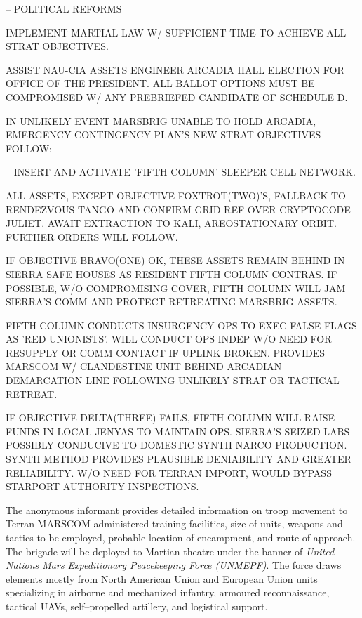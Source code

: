 \item {} -- POLITICAL REFORMS
    \startitemize[n]
    \item IMPLEMENT MARTIAL LAW W/ SUFFICIENT TIME TO ACHIEVE ALL STRAT OBJECTIVES.
    \item ASSIST NAU-CIA ASSETS ENGINEER ARCADIA HALL ELECTION FOR OFFICE OF THE PRESIDENT. ALL BALLOT OPTIONS MUST BE COMPROMISED W/ ANY PREBRIEFED CANDIDATE OF SCHEDULE D.
    \stopitemize
\stopitemize

IN UNLIKELY EVENT MARSBRIG UNABLE TO HOLD ARCADIA, EMERGENCY CONTINGENCY PLAN'S NEW STRAT OBJECTIVES FOLLOW:
\startitemize[4]
\item {} -- INSERT AND ACTIVATE 'FIFTH COLUMN' SLEEPER CELL NETWORK.

    \startitemize[n]
    \item ALL ASSETS, EXCEPT OBJECTIVE FOXTROT(TWO)'S, FALLBACK TO RENDEZVOUS TANGO AND CONFIRM GRID REF OVER CRYPTOCODE JULIET. AWAIT EXTRACTION TO KALI, AREOSTATIONARY ORBIT. FURTHER ORDERS WILL FOLLOW.

    \item IF OBJECTIVE BRAVO(ONE) OK, THESE ASSETS REMAIN BEHIND IN SIERRA SAFE HOUSES AS RESIDENT FIFTH COLUMN CONTRAS. IF POSSIBLE, W/O COMPROMISING COVER, FIFTH COLUMN WILL JAM SIERRA'S COMM AND PROTECT RETREATING MARSBRIG ASSETS.

    \item FIFTH COLUMN CONDUCTS INSURGENCY OPS TO EXEC FALSE FLAGS AS 'RED UNIONISTS'. WILL CONDUCT OPS INDEP W/O NEED FOR RESUPPLY OR COMM CONTACT IF UPLINK BROKEN. PROVIDES MARSCOM W/ CLANDESTINE UNIT BEHIND ARCADIAN DEMARCATION LINE FOLLOWING UNLIKELY STRAT OR TACTICAL RETREAT.

    \item IF OBJECTIVE DELTA(THREE) FAILS, FIFTH COLUMN WILL RAISE FUNDS IN LOCAL JENYAS TO MAINTAIN OPS. SIERRA'S SEIZED LABS POSSIBLY CONDUCIVE TO DOMESTIC SYNTH NARCO PRODUCTION. SYNTH METHOD PROVIDES PLAUSIBLE DENIABILITY AND GREATER RELIABILITY. W/O NEED FOR TERRAN IMPORT, WOULD BYPASS STARPORT AUTHORITY INSPECTIONS.
    \stopitemize
\stopitemize
\stopTimelineCorrespondenceDocument

The anonymous informant provides detailed information on troop movement to Terran MARSCOM administered training facilities, size of units, weapons and tactics to be employed, probable location of encampment, and route of approach. The brigade will be deployed to Martian theatre under the banner of {\it United Nations Mars Expeditionary Peacekeeping Force (UNMEPF)}. The force draws elements mostly from North American Union and European Union units specializing in airborne and mechanized infantry, armoured reconnaissance, tactical UAVs, self--propelled artillery, and logistical support.

